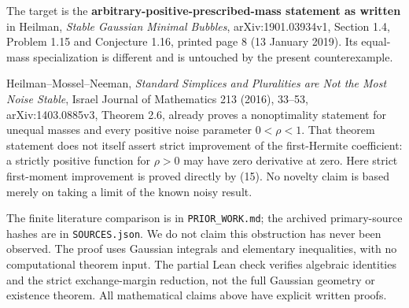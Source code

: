 \documentclass[
  11pt,
]{article}
\begin{document}
The target is the \textbf{arbitrary-positive-prescribed-mass statement
as written} in Heilman, \emph{Stable Gaussian Minimal Bubbles},
arXiv:1901.03934v1, Section 1.4, Problem 1.15 and Conjecture 1.16,
printed page 8 (13 January 2019). Its equal-mass specialization is
different and is untouched by the present counterexample.

Heilman--Mossel--Neeman, \emph{Standard Simplices and Pluralities are
Not the Most Noise Stable}, Israel Journal of Mathematics 213 (2016),
33--53, arXiv:1403.0885v3, Theorem 2.6, already proves a nonoptimality
statement for unequal masses and every positive noise parameter
\(0<\rho<1\). That theorem statement does not itself assert strict
improvement of the first-Hermite coefficient: a strictly positive
function for \(\rho>0\) may have zero derivative at zero. Here strict
first-moment improvement is proved directly by (15). No novelty claim is
based merely on taking a limit of the known noisy result.

The finite literature comparison is in \texttt{PRIOR\_WORK.md}; the
archived primary-source hashes are in \texttt{SOURCES.json}. We do not
claim this obstruction has never been observed. The proof uses Gaussian
integrals and elementary inequalities, with no computational theorem
input. The partial Lean check verifies algebraic identities and the
strict exchange-margin reduction, not the full Gaussian geometry or
existence theorem. All mathematical claims above have explicit written
proofs.
\end{document}
